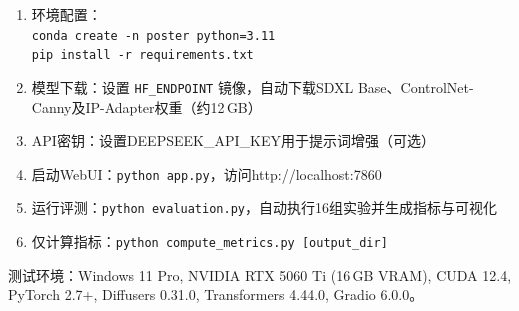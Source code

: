 \documentclass[12pt,a4paper]{ctexart}
\begin{document}
\begin{enumerate}[itemsep=1pt,topsep=4pt]
    \item 环境配置：\\[2pt] \texttt{conda create -n poster python=3.11}\\[2pt] \texttt{pip install -r requirements.txt}
    \item 模型下载：设置 \texttt{HF\_ENDPOINT} 镜像，自动下载SDXL Base、ControlNet-Canny及IP-Adapter权重（约12\,GB）
    \item API密钥：设置DEEPSEEK\_API\_KEY用于提示词增强（可选）
    \item 启动WebUI：\texttt{python app.py}，访问http://localhost:7860
    \item 运行评测：\texttt{python evaluation.py}，自动执行16组实验并生成指标与可视化
    \item 仅计算指标：\texttt{python compute\_metrics.py [output\_dir]}
\end{enumerate}

测试环境：Windows 11 Pro, NVIDIA RTX 5060 Ti (16\,GB VRAM), CUDA 12.4, PyTorch 2.7+, Diffusers 0.31.0, Transformers 4.44.0, Gradio 6.0.0。
\end{document}
